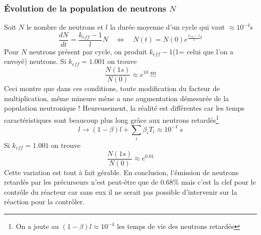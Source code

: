 \subsubsection{Évolution de la population de neutrons $N$}
Soit $N$ le nombre de neutrons et $l$ la durée moyenne d'un cycle qui vaut $\approx 10^{-4}$s
\begin{equation}
\frac{dN}{dt} = \dfrac{k_{eff}-1}{l}N\quad\Leftrightarrow\quad N(t)=N(0)e^{\frac{k_{eff}-1}{l}t}
\end{equation}
Pour $N$ neutrons présent par cycle, on produit $k_{eff}-1$(1= celui que l'on a envoyé) neutrons.
Si $k_{eff}=1.001$ on trouve
\begin{equation}
\frac{N(1s)}{N(0)} \approx e^{10}\ !!!
\end{equation}
Ceci montre que dans ces conditions, toute modification du facteur de multiplication, même
mineure mène a une augmentation démesurée de la population neutronique !
Heureusement, la réalité est différentes car les temps caractéristiques sont beaucoup plus long 
grâce aux neutrons retardés\footnote{On a joute au $(1-\beta)l\approx 10^{-4}$ les temps de vie 
des neutrons retardés}
\begin{equation}
l \longrightarrow (1-\beta)l + \sum_i\beta_iT_i \approx 10^{-1}\ s
\end{equation}
Si $k_{eff}=1.001$ on trouve
\begin{equation}
\frac{N(1s)}{N(0)} \approx e^{0.01}
\end{equation}
Cette variation est tout à fait gérable. En conclusion, l'émission de neutrons retardés par les
précurseurs n'est peut-être que de 0.68\% mais c'est la clef pour le contrôle du réacteur car 
sans eux il ne serait pas possible d'intervenir sur la réaction pour la contrôler.
